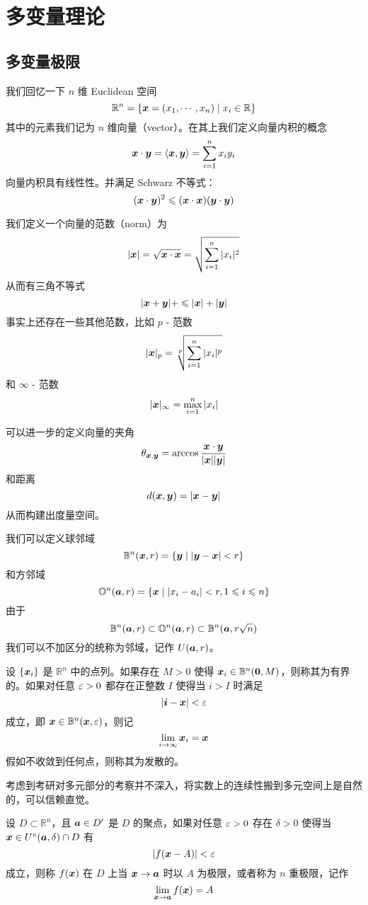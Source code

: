 \chapter{多变量理论}

\section{多变量极限}

我们回忆一下 $n$ 维 Euclidean 空间
\[ \mathbb{R}^n = \{\boldsymbol{x} = (x_1,\cdots,x_n) \mid x_i \in \mathbb{R} \} \]
其中的元素我们记为 $n$ 维向量（vector）。在其上我们定义向量内积的概念
\[ \boldsymbol{x} \cdot \boldsymbol{y} = \langle \boldsymbol{x}, \boldsymbol{y} \rangle= \sum_{i=1}^{n} x_i y_i \]
向量内积具有线性性。并满足 Schwarz 不等式：
\[ (\boldsymbol{x} \cdot \boldsymbol{y})^2 \leqslant (\boldsymbol{x} \cdot \boldsymbol{x})(\boldsymbol{y} \cdot \boldsymbol{y}) \]

我们定义一个向量的范数（norm）为
\[ |\boldsymbol{x}| = \sqrt{\boldsymbol{x} \cdot \boldsymbol{x}} = \sqrt{\sum_{i=1}^{n} |x_i|^2}  \]
从而有三角不等式
\[ |\boldsymbol{x} + \boldsymbol{y}| +\leqslant |\boldsymbol{x}| + |\boldsymbol{y}| \]
事实上还存在一些其他范数，比如 $p$ - 范数
\[ |\boldsymbol{x}|_p = \sqrt[p]{\sum_{i=1}^{n} |x_i|^p}  \]
和 $\infty$ - 范数
\[ |\boldsymbol{x}|_\infty = \max_{i=1}^{n} |x_i|  \]

可以进一步的定义向量的夹角
\[ \theta_{\boldsymbol{x}, \boldsymbol{y}} = \arccos\frac{\boldsymbol{x} \cdot \boldsymbol{y}}{|\boldsymbol{x}||\boldsymbol{y}|} \]
和距离
\[ d(\boldsymbol{x}, \boldsymbol{y}) = |\boldsymbol{x}-\boldsymbol{y}| \]
从而构建出度量空间。

我们可以定义球邻域
\[ \mathbb{B}^n(\boldsymbol{x}, r) = \{ \boldsymbol{y} \mid |\boldsymbol{y}-\boldsymbol{x}| < r \} \]
和方邻域
\[ \mathbb{O}^n(\boldsymbol{a}, r) = \{ \boldsymbol{x} \mid |x_i - a_i| < r, 1 \leqslant i \leqslant n \} \]
由于
\[ \mathbb{B}^n(\boldsymbol{a}, r) \subset \mathbb{O}^n(\boldsymbol{a}, r) \subset \mathbb{B}^n(\boldsymbol{a}, r\sqrt{n})  \]
我们可以不加区分的统称为邻域，记作 $U(\boldsymbol{a}, r)$。

\begin{definition}
	设 $\{\boldsymbol{x}_i\}$ 是 $\mathbb{R}^n$ 中的点列。如果存在 $M > 0$ 使得 $\boldsymbol{x}_i \in \mathbb{B}^n(\boldsymbol{0}, M)$，则称其为有界的。如果对任意 $\varepsilon > 0$ 都存在正整数 $I$ 使得当 $i > I$ 时满足
	\[ |\boldsymbol{i} - \boldsymbol{x}| < \varepsilon \]
	成立，即 $\boldsymbol{x} \in \mathbb{B}^n(\boldsymbol{x}, \varepsilon)$，则记
	\[ \lim_{i \to \infty} \boldsymbol{x}_i = \boldsymbol{x} \]
	假如不收敛到任何点，则称其为发散的。
\end{definition}

考虑到考研对多元部分的考察并不深入，将实数上的连续性搬到多元空间上是自然的，可以信赖直觉。

\begin{definition}
	设 $D \subset \mathbb{R}^n$，且 $\boldsymbol{a} \in D'$ 是 $D$ 的聚点，如果对任意 $\varepsilon > 0$ 存在 $\delta > 0$ 使得当 $\boldsymbol{x} \in U^{\circ}(\boldsymbol{a}, \delta) \cap D$ 有
	\[ |f(\boldsymbol{x} - A)| < \varepsilon \]
	成立，则称 $f(\boldsymbol{x})$ 在 $D$ 上当 $\boldsymbol{x} \to \boldsymbol{a}$ 时以 $A$ 为极限，或者称为 $n$ 重极限，记作
	\[ \lim_{\boldsymbol{x} \to \boldsymbol{a}} f(\boldsymbol{x}) = A \]
\end{definition}

